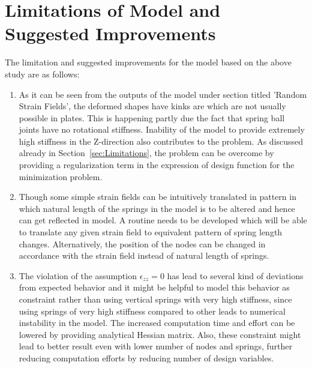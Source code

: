 \section{Limitations of Model and Suggested Improvements}
The limitation and suggested improvements for the model based on the above study are as follows:
\begin{enumerate}
    \item As it can be seen from the outputs of the model under section titled 'Random Strain Fields', the deformed shapes have kinks are which are not usually possible in plates. This is happening partly due the fact that spring ball joints have no rotational stiffness. Inability of the model to provide extremely high stiffness in the Z-direction also contributes to the problem. As discussed already in Section~\ref{sec:Limitations}, the problem can be overcome by providing a regularization term in the expression of design function for the minimization problem.
    \item Though some simple strain fields can be intuitively translated in pattern in which natural length of the springs in the model is to be altered and hence can get reflected in model. A routine needs to be developed which will be able to translate any given strain field to equivalent pattern of spring length changes. Alternatively, the position of the nodes can be changed in accordance with the strain field instead of natural length of springs.
    \item The violation of the assumption $\epsilon_{zz} = 0$ has lead to several kind of deviations from expected behavior and it might be helpful to model this behavior as constraint rather than using vertical springs with very high stiffness, since using springs of very high stiffness compared to other leads to numerical instability in the model. The increased computation time and effort can be lowered by providing analytical Hessian matrix. Also, these constraint might lead to better result even with lower number of nodes and springs, further reducing computation efforts by reducing number of design variables.
\end{enumerate}